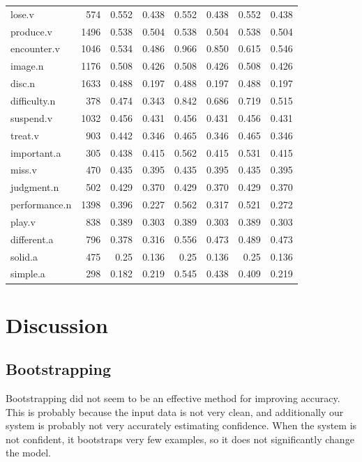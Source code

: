 \documentclass{article}
\begin{document}
\begin{longtable}{l | r r r r r r r}
lose.v      	&	574 	&	0.552	&	0.438	&	0.552	&	0.438	&	0.552	&	0.438\\
produce.v    	&	1496	&	0.538	&	0.504	&	0.538	&	0.504	&	0.538	&	0.504\\
encounter.v    	&	1046	&	0.534	&	0.486	&	0.966	&	0.850	&	0.615	&	0.546\\
image.n     	&	1176	&	0.508	&	0.426	&	0.508	&	0.426	&	0.508	&	0.426\\
disc.n      	&	1633	&	0.488	&	0.197	&	0.488	&	0.197	&	0.488	&	0.197\\
difficulty.n	&	378 	&	0.474	&	0.343	&	0.842	&	0.686	&	0.719	&	0.515\\
suspend.v    	&	1032	&	0.456	&	0.431	&	0.456	&	0.431	&	0.456	&	0.431\\
treat.v        	&	903 	&	0.442	&	0.346	&	0.465	&	0.346	&	0.465	&	0.346\\
important.a    	&	305 	&	0.438	&	0.415	&	0.562	&	0.415	&	0.531	&	0.415\\
miss.v        	&	470 	&	0.435	&	0.395	&	0.435	&	0.395	&	0.435	&	0.395\\
judgment.n    	&	502 	&	0.429	&	0.370	&	0.429	&	0.370	&	0.429	&	0.370\\
performance.n	&	1398	&	0.396	&	0.227	&	0.562	&	0.317	&	0.521	&	0.272\\
play.v        	&	838 	&	0.389	&	0.303	&	0.389	&	0.303	&	0.389	&	0.303\\
different.a    	&	796 	&	0.378	&	0.316	&	0.556	&	0.473	&	0.489	&	0.473\\
solid.a        	&	475 	&	0.25	&	0.136	&	0.25	&	0.136	&	0.25	&	0.136\\
simple.a    	&	298 	&	0.182	&	0.219	&	0.545	&	0.438	&	0.409	&	0.219\\

\end{longtable}

\section{Discussion}

\subsection{Bootstrapping}

Bootstrapping did not seem to be an effective method for improving accuracy.  This is probably because the input data is not very clean, and additionally our system is probably not very accurately estimating confidence.  When the system is not confident, it bootstraps very few examples, so it does not significantly change the model.
\end{document}
